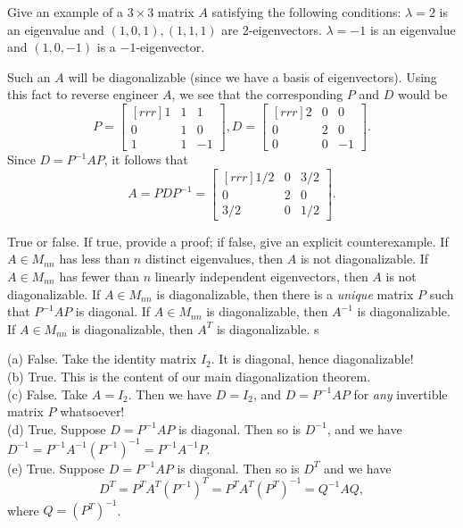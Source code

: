 \ii Give an example of a $3\times 3$ matrix $A$ satisfying the following conditions:
\bb[(i)]
\ii $\lambda=2$ is an eigenvalue and $(1,0,1), (1,1,1)$ are 2-eigenvectors. 
\ii $\lambda=-1$ is an eigenvalue and $(1,0,-1)$ is a $-1$-eigenvector. 
\ee  
\begin{solution}
Such an $A$ will be diagonalizable (since we have a basis of eigenvectors). Using this fact to reverse engineer $A$, we see that the corresponding $P$ and $D$ would be 
\[
P=\begin{bmatrix}[rrr]
1&1&1\\
0&1&0\\
1&1&-1
\end{bmatrix}, D=\begin{bmatrix}[rrr]
2&0&0\\
0&2&0\\
0&0&-1
\end{bmatrix}.
\]
Since $D=P^{-1}AP$, it follows that 
\[
A=PDP^{-1}=\begin{bmatrix}[rrr]
1/2&0&3/2\\
0&2&0\\
3/2&0&1/2
\end{bmatrix}.
\]
\end{solution}
\ii True or false. If true, provide a proof; if false, give an explicit counterexample. 
\bb
\ii If $A\in M_{nn}$ has less than $n$ distinct eigenvalues, then $A$ is not diagonalizable. 
\ii If $A\in M_{nn}$ has fewer than $n$ linearly independent eigenvectors, then $A$ is not diagonalizable. 
\ii If $A\in M_{nn}$ is diagonalizable, then there is a {\em unique} matrix $P$ such that $P^{-1}AP$ is diagonal. 
\ii If $A\in M_{nn}$ is diagonalizable, then $A^{-1}$ is diagonalizable. 
\ii If $A\in M_{nn}$ is diagonalizable, then $A^T$ is diagonalizable. s
\ee
\begin{solution}
\noindent 
(a) False. Take the identity matrix $I_2$. It is diagonal, hence diagonalizable! 
\\
(b) True. This is the content of our main diagonalization theorem.
\\
(c) False. Take $A=I_2$. Then we have $D=I_2$, and $D=P^{-1}AP$ for {\em any} invertible matrix $P$ whatsoever! 
\\
(d) True. Suppose $D=P^{-1}AP$ is diagonal. Then so is $D^{-1}$, and we have $D^{-1}=P^{-1}A^{-1}(P^{-1})^{-1}=P^{-1}A^{-1}P$. 
\\
(e) True. Suppose $D= P^{-1}AP$ is diagonal. Then so is $D^T$ and we have 
\[
D^T=P^TA^T(P^{-1})^T=P^TA^T(P^T)^{-1}=Q^{-1}AQ,
\]
where $Q=(P^T)^{-1}$. 
\end{solution}
\ee